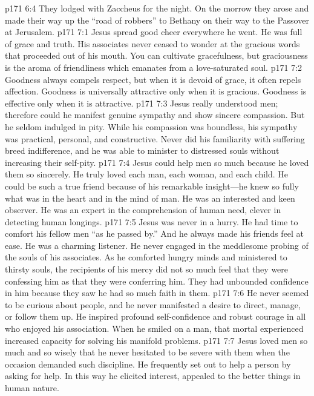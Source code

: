 \vs p171 6:4 They lodged with Zaccheus for the night. On the morrow they arose and made their way up the “road of robbers” to Bethany on their way to the Passover at Jerusalem.
\vs p171 7:1 Jesus spread good cheer everywhere he went. He was full of grace and truth. His associates never ceased to wonder at the gracious words that proceeded out of his mouth. You can cultivate gracefulness, but graciousness is the aroma of friendliness which emanates from a love\hyp{}saturated soul.
\vs p171 7:2 Goodness always compels respect, but when it is devoid of grace, it often repels affection. Goodness is universally attractive only when it is gracious. Goodness is effective only when it is attractive.
\vs p171 7:3 Jesus really understood men; therefore could he manifest genuine sympathy and show sincere compassion. But he seldom indulged in pity. While his compassion was boundless, his sympathy was practical, personal, and constructive. Never did his familiarity with suffering breed indifference, and he was able to minister to distressed souls without increasing their self\hyp{}pity.
\vs p171 7:4 Jesus could help men so much because he loved them so sincerely. He truly loved each man, each woman, and each child. He could be such a true friend because of his remarkable insight---he knew so fully what was in the heart and in the mind of man. He was an interested and keen observer. He was an expert in the comprehension of human need, clever in detecting human longings.
\vs p171 7:5 Jesus was never in a hurry. He had time to comfort his fellow men “as he passed by.” And he always made his friends feel at ease. He was a charming listener. He never engaged in the meddlesome probing of the souls of his associates. As he comforted hungry minds and ministered to thirsty souls, the recipients of his mercy did not so much feel that they were confessing  him as that they were conferring  him. They had unbounded confidence in him because they saw he had so much faith in them.
\vs p171 7:6 He never seemed to be curious about people, and he never manifested a desire to direct, manage, or follow them up. He inspired profound self\hyp{}confidence and robust courage in all who enjoyed his association. When he smiled on a man, that mortal experienced increased capacity for solving his manifold problems.
\vs p171 7:7 Jesus loved men so much and so wisely that he never hesitated to be severe with them when the occasion demanded such discipline. He frequently set out to help a person by asking for help. In this way he elicited interest, appealed to the better things in human nature.
